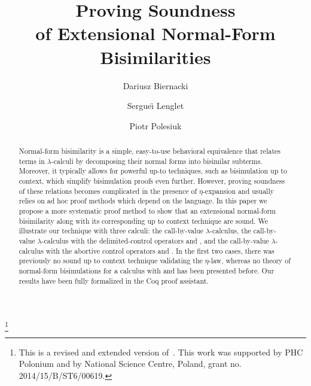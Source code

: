 \documentclass{lmcs}
\theoremstyle{defC}
\begin{document}
\title[Proving Soundness of Extensional Normal-Form
  Bisimilarities]{Proving Soundness\texorpdfstring{\\}{} of Extensional Normal-Form
  Bisimilarities}

\author[]{Dariusz Biernacki}

\author[]{Sergue\"{\i} Lenglet}

\author[]{Piotr Polesiuk}

\address{University of Wroc\l{}aw, Wroc\l{}aw, Poland}

\address{Universit\'e de Lorraine, Nancy, France}

\thanks{This is a revised and extended version
  of~\cite{Biernacki-al:MFPS17}. This work was supported by PHC Polonium and by
  National Science Centre, Poland, grant no. 2014/15/B/ST6/00619.}




\begin{abstract}
  Normal-form bisimilarity is a simple, easy-to-use behavioral equivalence that
  relates terms in $\lambda$-calculi by decomposing their normal forms into
  bisimilar subterms. Moreover, it typically allows for powerful up-to
  techniques, such as bisimulation up to context, which simplify bisimulation
  proofs even further. However, proving soundness of these relations becomes
  complicated in the presence of $\eta$-expansion and usually relies on ad hoc
  proof methods which depend on the language. In this paper we propose a more
  systematic proof method to show that an extensional normal-form bisimilarity
  along with its corresponding up to context technique are sound. We illustrate
  our technique with three calculi: the call-by-value $\lambda$-calculus, the
  call-by-value $\lambda$-calculus with the delimited-control operators
  \textshift{} and \textreset{}, and the call-by-value $\lambda$-calculus with
  the abortive control operators \textcallcc and \textabort. In the first two
  cases, there was previously no sound up to context technique validating the
  $\eta$-law, whereas no theory of normal-form bisimulations for a calculus with
  \textcallcc and \textabort has been presented before. Our results have been
  fully formalized in the Coq proof assistant.
\end{abstract}
\end{document}
